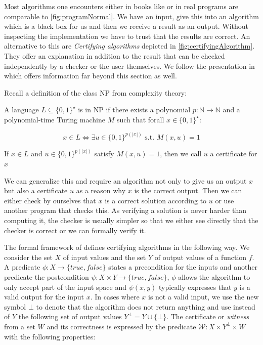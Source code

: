 Most algorithms one encounters either in books like \cite{AlgorithmsBook} or in real programs are comparable to \cref{fig:programNormal}. We have an input, give this into an algorithm which is a black box for us and then we receive a result as an output. Without inspecting the implementation we have to trust that the results are correct.
An alternative to this are \textit{Certifying algorithms} depicted in \cref{fig:certifyingAlgorithm}. They offer an explanation in addition to the result that can be checked independently by a checker or the user themselves. We follow the presentation in \cite{CertAlg} which offers information far beyond this section as well. 

Recall a definition of the class NP from complexity theory:

\begin{definition}
    A language $L \subseteq \{0,1\}^\star$ is in NP if there exists a polynomial $p: \mathbb{N} \to \mathbb{N}$ and a polynomial-time Turing machine $M$ such that forall $x \in \{0,1\}^\star$:

    \[ x \in L  \Leftrightarrow \exists u \in \{0,1\}^{p(|x|)}\text{ s.t. } M(x,u) = 1\]

    If $x \in L$ and $u \in \{0,1\}^{p(|x|)}$ satisfy $M(x,u) = 1$, then we call $u$ a certificate for $x$
\end{definition}

We can generalize this and require an algorithm not only to give us an output $x$ but also a certificate $u$ as a reason why $x$ is the correct output. Then we can either check by ourselves that $x$ is a correct solution according to $u$ or use another program that checks this. As verifying a solution is never harder than computing it, the checker is usually simpler so that we either see directly that the checker is correct or we can formally verify it.

The formal framework of \cite{CertAlg} defines certifying algorithms in the following way. We consider the set $X$ of input values and the set $Y$ of output values of a function $f$. A predicate $\phi: X \to \{true, false\}$ states a precondition for the inputs and another predicate the postcondition $\psi: X \times Y \to \{true, false\}$, $\phi$ allows the algorithm to only accept part of the input space and $\psi(x,y)$ typically expresses that $y$ is a valid output for the input $x$. In cases where $x$ is not a valid input, we use the new symbol $\bot$ to denote that the algorithm does not return anything and use instead of $Y$ the following set of output values $Y^\bot = Y \cup \{\bot\}$.
The certificate or \textit{witness} from a set $W$ and its correctness is expressed by the predicate $\mathcal{W}: X \times Y^\bot \times W$ with the following properties:

